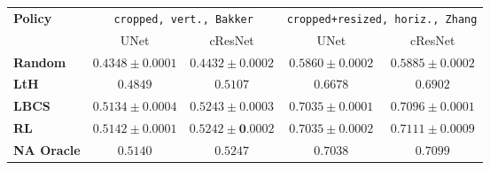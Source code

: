 \begin{tabular}{lcccc}
    \toprule
    
   \multirow{2}{*}{\textbf{Policy}}& \multicolumn{2}{c}{\texttt{cropped, vert., Bakker}} & \multicolumn{2}{c}{\texttt{cropped+resized, horiz., Zhang}}\\
   \cmidrule(l){2-3} \cmidrule(l){4-5}
   & UNet  & cResNet & UNet  & cResNet \\
   \midrule
   \textbf{Random}  &  $0.4348\pm 0.0001$  & $0.4432\pm 0.0002$ &$0.5860\pm 0.0002$&$0.5885\pm 0.0002$ \\
   \textbf{LtH}  & $0.4849$                & $0.5107$&$0.6678$ &$0.6902$ \\
   \textbf{LBCS}  & $0.5134\pm0.0004$      & $\mathbf{0.5243\pm 0.0003}$& $\mathbf{0.7035\pm 0.0001}$ &$0.7096 \pm 0.0001$\\
   \textbf{RL} & $\mathbf{0.5142\pm 0.0001}$        & $\mathbf{0.5242\pm0 .0002}$ &$\mathbf{0.7035 \pm 0.0002}$&$\mathbf{0.7111\pm 0.0009}$\\
   \midrule
   \textbf{NA Oracle}  & $0.5140$          & $0.5247$          & $0.7038$    &$0.7099$\\
   
   \bottomrule
   \end{tabular}
   
   